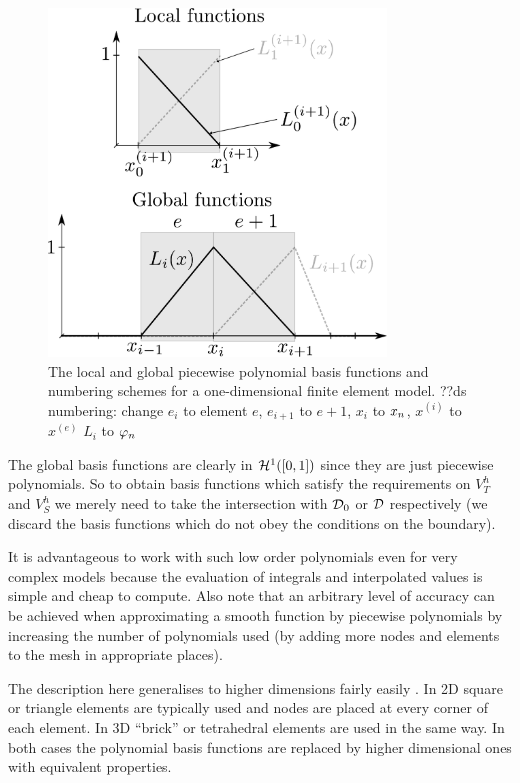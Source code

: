 {\begin{figure}
  \center
  \includegraphics[width=0.8\textwidth]{./images/local_global_functions}
  \caption{The local and global piecewise polynomial basis functions and numbering schemes for a one-dimensional finite element model.  ??ds numbering: change $e_i$ to element $e$, $e_{i+1}$ to $e+1$, $x_i$ to $x_n$, $x^(i)$ to $x^(e)$ $L_i$ to $\varphi_n$
  }
  \label{fig:local_global_functions}
\end{figure}

The global basis functions are clearly in $\mathcal{H}^1([0,1])$ since they are just piecewise polynomials.
So to obtain basis functions which satisfy the requirements on $V_T^h$ and $V_S^h$ we merely need to take the intersection with $\mathcal{D}_0$ or $\mathcal{D}$ respectively (\ie we discard the basis functions which do not obey the conditions on the boundary).

It is advantageous to work with such low order polynomials even for very complex models because the evaluation of integrals and interpolated values is simple and cheap to compute.
Also note that an arbitrary level of accuracy can be achieved when approximating a smooth function by piecewise polynomials by increasing the number of polynomials used (\ie by adding more nodes and elements to the mesh in appropriate places).

The description here generalises to higher dimensions fairly easily \cite[20]{HowardElmanDavidSilvester2006}.
In 2D square or triangle elements are typically used and nodes are placed at every corner of each element.
In 3D ``brick'' or tetrahedral elements are used in the same way.
In both cases the polynomial basis functions are replaced by higher dimensional ones with equivalent properties.

}
